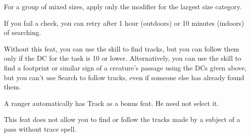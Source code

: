 {

For a group of mixed sizes, apply only the modifier for the largest size category.

If you fail a  check, you can retry after 1 hour (outdoors) or 10 minutes (indoors) of searching.}
{Without this feat, you can use the  skill to find tracks, but you can follow them only if the DC for the task is 10 or lower. Alternatively, you can use the  skill to find a footprint or similar sign of a creature's passage using the DCs given above, but you can't use Search to follow tracks, even if someone else has already found them.}
{A ranger automatically has Track as a bonus feat. He need not select it.

This feat does not allow you to find or follow the tracks made by a subject of a pass without trace spell.}
